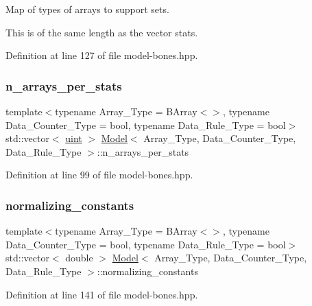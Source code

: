 Map of types of arrays to support sets. 

This is of the same length as the vector {\ttfamily stats}. 

Definition at line 127 of file model-\/bones.\+hpp.

\mbox{\label{class_model_a410caeff58afe605520c878a0689abf5}} 
\subsubsection{\texorpdfstring{n\+\_\+arrays\+\_\+per\+\_\+stats}{n\_arrays\_per\_stats}}
{\footnotesize\ttfamily template$<$typename Array\+\_\+\+Type  = B\+Array$<$$>$, typename Data\+\_\+\+Counter\+\_\+\+Type  = bool, typename Data\+\_\+\+Rule\+\_\+\+Type  = bool$>$ \\
std\+::vector$<$ \hyperlink{typedefs_8hpp_a91ad9478d81a7aaf2593e8d9c3d06a14}{uint} $>$ \hyperlink{class_model}{Model}$<$ Array\+\_\+\+Type, Data\+\_\+\+Counter\+\_\+\+Type, Data\+\_\+\+Rule\+\_\+\+Type $>$\+::n\+\_\+arrays\+\_\+per\+\_\+stats}



Definition at line 99 of file model-\/bones.\+hpp.

\mbox{\label{class_model_aa4479d146005e89350dad6ba7bd8121a}} 
\subsubsection{\texorpdfstring{normalizing\+\_\+constants}{normalizing\_constants}}
{\footnotesize\ttfamily template$<$typename Array\+\_\+\+Type  = B\+Array$<$$>$, typename Data\+\_\+\+Counter\+\_\+\+Type  = bool, typename Data\+\_\+\+Rule\+\_\+\+Type  = bool$>$ \\
std\+::vector$<$ double $>$ \hyperlink{class_model}{Model}$<$ Array\+\_\+\+Type, Data\+\_\+\+Counter\+\_\+\+Type, Data\+\_\+\+Rule\+\_\+\+Type $>$\+::normalizing\+\_\+constants}



Definition at line 141 of file model-\/bones.\+hpp.

\mbox{\label{class_model_add8183af946f2871480b6a6f9f1c8013}} 
